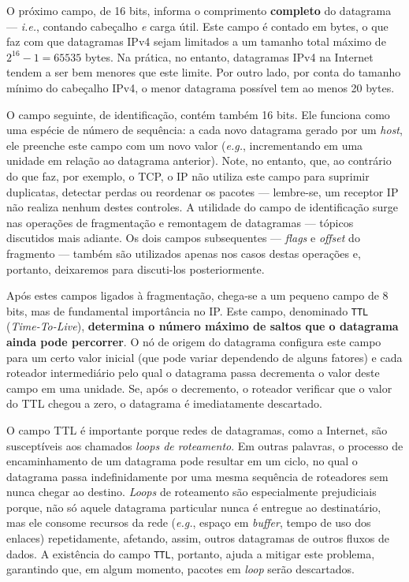 \documentclass{article}
\begin{document}
O próximo campo, de 16 bits, informa o comprimento \textbf{completo} do datagrama --- \textit{i.e.}, contando cabeçalho \textit{e} carga útil. Este campo é contado em bytes, o que faz com que datagramas IPv4 sejam limitados a um tamanho total máximo de $2^{16} - 1 = 65535$ bytes. Na prática, no entanto, datagramas IPv4 na Internet tendem a ser bem menores que este limite. Por outro lado, por conta do tamanho mínimo do cabeçalho IPv4, o menor datagrama possível tem ao menos 20 bytes.

O campo seguinte, de identificação, contém também 16 bits. Ele funciona como uma espécie de número de sequência: a cada novo datagrama gerado por um \textit{host}, ele preenche este campo com um novo valor (\textit{e.g.}, incrementando em uma unidade em relação ao datagrama anterior). Note, no entanto, que, ao contrário do que faz, por exemplo, o TCP, o IP não utiliza este campo para suprimir duplicatas, detectar perdas ou reordenar os pacotes --- lembre-se, um receptor IP não realiza nenhum destes controles. A utilidade do campo de identificação surge nas operações de fragmentação e remontagem de datagramas --- tópicos discutidos mais adiante. Os dois campos subsequentes --- \textit{flags} e \textit{offset} do fragmento --- também são utilizados apenas nos casos destas operações e, portanto, deixaremos para discuti-los posteriormente.

Após estes campos ligados à fragmentação, chega-se a um pequeno campo de 8 bits, mas de fundamental importância no IP. Este campo, denominado \texttt{TTL} (\textit{Time-To-Live}), \textbf{determina o número máximo de saltos que o datagrama ainda pode percorrer}. O nó de origem do datagrama configura este campo para um certo valor inicial (que pode variar dependendo de alguns fatores) e cada roteador intermediário pelo qual o datagrama passa decrementa o valor deste campo em uma unidade. Se, após o decremento, o roteador verificar que o valor do TTL chegou a zero, o datagrama é imediatamente descartado.

O campo TTL é importante porque redes de datagramas, como a Internet, são susceptíveis aos chamados \textit{loops de roteamento}. Em outras palavras, o processo de encaminhamento de um datagrama pode resultar em um ciclo, no qual o datagrama passa indefinidamente por uma mesma sequência de roteadores sem nunca chegar ao destino. \textit{Loops} de roteamento são especialmente prejudiciais porque, não só aquele datagrama particular nunca é entregue ao destinatário, mas ele consome recursos da rede (\textit{e.g.}, espaço em \textit{buffer}, tempo de uso dos enlaces) repetidamente, afetando, assim, outros datagramas de outros fluxos de dados. A existência do campo \texttt{TTL}, portanto, ajuda a mitigar este problema, garantindo que, em algum momento, pacotes em \textit{loop} serão descartados.
\end{document}
